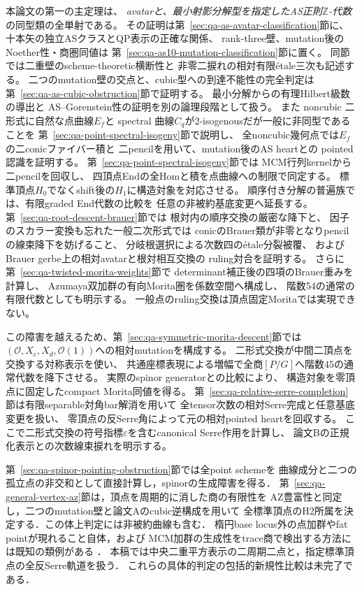 \documentclass[a4paper,11pt]{ltjsarticle}
\numberwithin{equation}{section}
\theoremstyle{plain}
\theoremstyle{definition}
\theoremstyle{remark}
\begin{document}
本論文の第一の主定理は、
\emph{avatarと、最小射影分解型を指定したAS正則$\mathbb Z$-代数}
の同型類の全単射である。
その証明は第~\ref{sec:qa-as-avatar-classification}節に、
十本矢の独立ASクラスとQP表示の正確な関係、
rank-three壁、mutation後のNoether性・商圏同値は
第~\ref{sec:qa-as10-mutation-classification}節に置く。
同節では二重壁のscheme-theoretic横断性と
非零二捩れの相対有限étale三次も記述する。
二つのmutation壁の交点と、cubic型への到達不能性の完全判定は
第~\ref{sec:qa-as-cubic-obstruction}節で証明する。
最小分解からの有理Hilbert級数の導出と
AS--Gorenstein性の証明を別の論理段階として扱う。
また noncubic 二形式に自然な点曲線$E_f$と
spectral 曲線$C_q$が2-isogenousだが一般に非同型であることを
第~\ref{sec:qa-point-spectral-isogeny}節で説明し、
全noncubic幾何点では$E_f$の二conicファイバー積と
二pencilを用いて、mutation後のAS heartとの
pointed認識を証明する。
第~\ref{sec:qa-point-spectral-isogeny}節では
MCM行列kernelから二pencilを回収し、
四頂点Endの全Homと積を点曲線への制限で同定する。
標準頂点$H_0$でなくshift後の$H_1$に構造対象を対応させる。
順序付き分解の普遍族では、有限graded End代数の比較を
任意の非被約基底変更へ延長する。
第~\ref{sec:qa-root-descent-brauer}節では
根対内の順序交換の厳密な降下と、
因子のスカラー変換も忘れた一般二次形式では
conicのBrauer類が非零となりpencilの線束降下を妨げること、
分岐根選択による次数四の\'{e}tale分裂被覆、
およびBrauer gerbe上の相対avatarと根対相互交換の
ruling対合を証明する。
さらに第~\ref{sec:qa-twisted-morita-weights}節で
determinant補正後の四項のBrauer重みを計算し、
Azumaya双加群の有向Morita圏を係数空間へ構成し、
階数54の通常の有限代数としても明示する。
一般点のruling交換は頂点固定Moritaでは実現できない。

この障害を越えるため、第~\ref{sec:qa-symmetric-morita-descent}節では
$(\mathcal O,X_c,X_d,\mathcal O(1))$への相対mutationを構成する。
二形式交換が中間二頂点を交換する対称表示を使い、
共通座標表現による増幅で全商$[P/G]$へ階数$45$の通常代数を降下させる。
実際のspinor generatorとの比較により、
構造対象を零頂点に固定したcompact Morita同値を得る。
第~\ref{sec:qa-relative-serre-completion}節は有限separable対角bar解消を用いて
全tensor次数の相対Serre完成と任意基底変更を扱い、
零頂点の反Serre角によって元の相対pointed heartを回収する。
ここで二形式交換の符号指標$\varepsilon$を含むcanonical Serre作用を計算し、
論文Bの正規化表示との次数線束捩れを明示する。

第~\ref{sec:qa-spinor-pointing-obstruction}節では全point schemeを
曲線成分と二つの孤立点の非交和として直接計算し，spinorの生成障害を得る．
第~\ref{sec:qa-general-vertex-az}節は，頂点を周期的に消した商の有限性を
AZ豊富性と同定し，二つのmutation壁と論文Aのcubic逆構成を用いて
全標準頂点のH2所属を決定する．この体上判定には非被約曲線も含む．
楕円base locus外の点加群やfat pointが現れること自体，および
MCM加群の生成性をtrace商で検出する方法には既知の類例がある
\cite[\S10.5]{SVdB2013}\cite[Lemma~6.6 and proof of Proposition~6.10]{RogalskiSierraStafford2020}．
本稿では中央二重平方表示の二周期二点と，指定標準頂点の全反Serre軌道を扱う．
これらの具体的判定の包括的新規性比較は未完了である．
\end{document}
